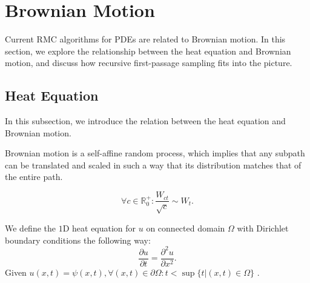 \documentclass[a4paper,12pt]{article}
\begin{document}
\begin{pythonn}
\end{pythonn}


\section{Brownian Motion}

Current RMC algorithms for PDEs are related to Brownian motion. In this section,
we explore the relationship between the heat equation and Brownian motion,
and discuss how recursive first-passage sampling fits into the picture.


\subsection{Heat Equation}
In this subsection, we introduce the relation between the heat equation and
Brownian motion.



\begin{lemma} \label{lem:self affine}
    Brownian motion is a self-affine random process, which implies
    that any subpath can be translated and scaled in such a way
    that its distribution matches that of the entire path.

    \begin{equation}
        \forall c \in \mathbb{R}^{+}_{0}: \frac{W_{ct}}{\sqrt{c}} \sim W_{t}.
    \end{equation}
\end{lemma}

\begin{definition} \label{def:heat equation}
    We define the $1$D heat equation for $u$ on connected domain $\Omega$
    with  Dirichlet boundary conditions the following way:
    \begin{equation}
        \frac{\partial u}{\partial t} = \frac{\partial^{2} u}{\partial x ^{2}}.
    \end{equation}
    Given $u(x,t)=\psi(x,t) ,\forall (x,t) \in \partial \Omega: t<\sup \{
        t| (x,t) \in \Omega\}$ .
\end{definition}
\end{document}
